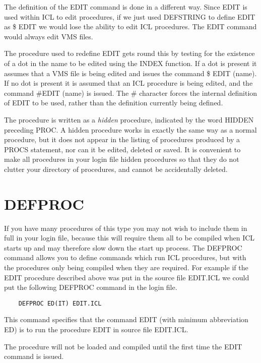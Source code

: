 The definition of the EDIT command is done in a different way. Since EDIT
is used within ICL to edit procedures, if we just used DEFSTRING to define
EDIT as \$ EDIT we would lose the ability to edit ICL procedures. The EDIT
command would always edit VMS files.

The procedure used to redefine EDIT gets round this by testing for the
existence of a dot in the name to be edited using the INDEX function. If
a dot is present it assumes that a VMS file is being edited and issues the
command \$ EDIT (name). If no dot is present it is assumed that an ICL
procedure is being edited, and the command \#EDIT (name) is issued. The \#     
character forces the internal definition of EDIT to be used, rather than
the definition currently being defined.

The procedure is written as a {\em hidden} procedure, indicated by the word
HIDDEN preceding PROC. A hidden procedure works in exactly the same way
as a normal procedure, but it does not appear in the listing of procedures
produced by a PROCS statement, nor can it be edited, deleted or saved. It
is convenient to make all procedures in your login file hidden procedures
so that they do not clutter your directory of procedures, and cannot be
accidentally deleted.

\section{DEFPROC}

If you have many procedures of this type you may not wish to include them
in full in your login file, because this will require them all to be compiled
when ICL starts up and may therefore slow down the start up process. The
DEFPROC command allows you to define commands which run ICL procedures,
but with the procedures only being compiled when they are required. For
example if the EDIT procedure described above was put in the source file
EDIT.ICL we could put the following DEFPROC command in the login file.

\begin{verbatim}
    DEFPROC ED(IT) EDIT.ICL
\end{verbatim}

This command specifies that the command EDIT (with minimum abbreviation
ED) is to run the procedure EDIT in source file EDIT.ICL. 
                   
The procedure will not be loaded and compiled until the first time the
EDIT command is issued.
    
